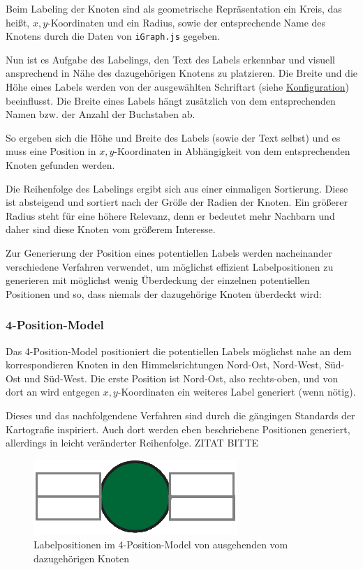 

Beim Labeling der Knoten sind als geometrische Repräsentation ein Kreis, das heißt, $x,y$-Koordinaten
und ein Radius, sowie der entsprechende Name des Knotens durch die Daten von \texttt{iGraph.js} gegeben.

Nun ist es Aufgabe des Labelings, den Text des Labels erkennbar und visuell ansprechend in Nähe des dazugehörigen Knotens zu platzieren.
Die Breite und die Höhe eines Labels werden von der ausgewählten Schriftart (siehe \hyperref[sec:configuration]{Konfiguration}) beeinflusst.
Die Breite eines Labels hängt zusätzlich von dem entsprechenden Namen bzw. der Anzahl der Buchstaben ab.

So ergeben sich die Höhe und Breite des Labels (sowie der Text selbst) und es muss eine Position in $x,y$-Koordinaten in Abhängigkeit
von dem entsprechenden Knoten gefunden werden.

Die Reihenfolge des Labelings ergibt sich aus einer einmaligen Sortierung.
Diese ist absteigend und sortiert nach der Größe der Radien der Knoten.
Ein größerer Radius steht für eine höhere Relevanz, denn er bedeutet mehr Nachbarn und daher sind diese Knoten vom größerem Interesse.

Zur Generierung der Position eines potentiellen Labels werden nacheinander verschiedene Verfahren verwendet, um möglichst effizient Labelpositionen zu generieren
mit möglichst wenig Überdeckung der einzelnen potentiellen Positionen und so, dass niemals der dazugehörige Knoten überdeckt wird:

\subsubsection{4-Position-Model}
\label{subsubsec:4pos}
Das 4-Position-Model positioniert die potentiellen Labels möglichst nahe an dem korrespondieren Knoten in den Himmelsrichtungen Nord-Ost, Nord-West, Süd-Ost und Süd-West.
Die erste Position ist Nord-Ost, also rechts-oben, und von dort an wird entgegen $x,y$-Koordinaten ein weiteres Label generiert (wenn nötig).

Dieses und das nachfolgendene Verfahren sind durch die gängingen Standards der Kartografie inspiriert. Auch dort werden eben beschriebene
Positionen generiert, allerdings in leicht veränderter Reihenfolge. ZITAT BITTE

\begin{figure}[H]
    \centering
    \includegraphics[scale=0.4]{../img/4pos}
    \caption{Labelpositionen im 4-Position-Model von ausgehenden vom dazugehörigen Knoten}
    \label{fig:4pos}
\end{figure}

